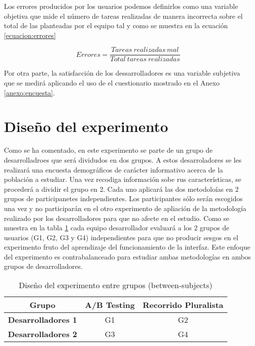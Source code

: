 \documentclass[a4paper,12pt]{report}
\begin{document}
Los errores producidos por los usuarios podemos definirlos como una variable objetiva que mide el número de tareas realizadas de manera incorrecta sobre el total de las planteadas por el equipo tal y como se muestra en la ecuación \ref{ecuacion:errores}

\begin{equation}
Errores = \frac{Tareas\ realizadas\ mal}{Total\ tareas\ realizadas}
\label{ecuacion:errores}
\end{equation}

Por otra parte, la satisfacción de los dessarrolladores es una variable subjetiva que se medirá aplicando el uso de el cuestionario mostrado en el Anexo \ref{anexo:encuesta}. 

\section{Diseño del experimento}
Como se ha comentado, en este experimento se parte de un grupo de desarrolladroes que será dividudos en dos grupos. A estos desarroladores se les realizará una encuesta demográficos de carácter informativo acerca de la población a estudiar. Una vez recodiga información sobe rus características, se procederá a dividir el grupo en 2. Cada uno aplicará las dos metodoloías en 2 grupos de participanetes independientes. Los participantes sólo serán escogidos una vez y no participarán en el otro experimento de apliación de la metodología realizado por los desarrolladores para que no afecte en el estudio. Como se muestra en la tabla \ref{tab:diseño_experimento} cada equipo desarrollador evaluará a los 2 grupos de usuarios (G1, G2, G3 y G4) independientes para que no producir sesgos en el experimento fruto del aprendizaje del funcionamiento de la interfaz. Este enfoque del experimento es contrabalanceado para estudiar ambas metodologías en ambos grupos de desarrolladores.

\begin{table}[h]
\centering
\begin{tabular}{|c|c|c|}
\hline
\textbf{Grupo} & \textbf{A/B Testing} & \textbf{Recorrido Pluralista} \\ \hline
\textbf{Desarrolladores 1} & G1 & G2 \\ \hline
\textbf{Desarrolladores 2} & G3 & G4 \\ \hline
\end{tabular}
\caption{Diseño del experimento entre grupos (between-subjects)}
\label{tab:diseño_experimento}
\end{table}
\end{document}
